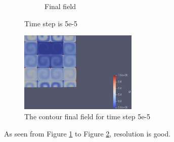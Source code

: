 \documentclass{article}
\begin{document}
\begin{figure}[hbt!]
\begin{subfigure}{0.4\textwidth}
        \caption{Final field}
  \end{subfigure}
  \caption{Time step is 5e-5}
  \label{t2m5_1} 
\end{figure}

\begin{figure}[hbt!]
    \centering
    \includegraphics[width=0.5\textwidth]{Figures/5e-5 320x320/contour.png}
    \caption{The contour final field for time step 5e-5}
    \label{t2m5_2} 
\end{figure}

As seen from Figure \ref{t2m5_1} to Figure \ref{t2m5_2}, resolution is good.



\clearpage
\end{document}
